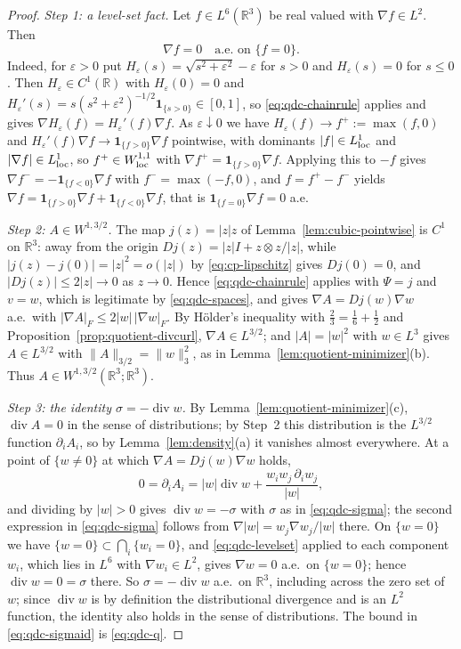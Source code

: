 \documentclass[11pt]{article}
\theoremstyle{definition}
\theoremstyle{plain}
\newcommand{\R}{\mathbb R}
\newcommand{\norm}[1]{\lVert #1\rVert}
\begin{document}
\begin{proof}
\emph{Step 1: a level-set fact.}  Let $f\in L^6(\R^3)$ be real valued with
$\nabla f\in L^2$.  Then
\begin{equation}\label{eq:qdc-levelset}
 \nabla f=0\quad\text{a.e.\ on }\{f=0\}.
\end{equation}
Indeed, for $\varepsilon>0$ put $H_\varepsilon(s)=\sqrt{s^2+\varepsilon^2}-\varepsilon$
for $s>0$ and $H_\varepsilon(s)=0$ for $s\le0$.  Then $H_\varepsilon\in C^1(\R)$
with $H_\varepsilon(0)=0$ and
$H_\varepsilon'(s)=s(s^2+\varepsilon^2)^{-1/2}\mathbf1_{\{s>0\}}\in[0,1]$, so
\eqref{eq:qdc-chainrule} applies and gives
$\nabla H_\varepsilon(f)=H_\varepsilon'(f)\nabla f$.  As
$\varepsilon\downarrow0$ we have $H_\varepsilon(f)\to f^+:=\max(f,0)$ and
$H_\varepsilon'(f)\nabla f\to\mathbf1_{\{f>0\}}\nabla f$ pointwise, with
dominants $|f|\in L^1_{\rm loc}$ and $|\nabla f|\in L^1_{\rm loc}$, so
$f^+\in W^{1,1}_{\rm loc}$ with $\nabla f^+=\mathbf1_{\{f>0\}}\nabla f$.
Applying this to $-f$ gives
$\nabla f^-=-\mathbf1_{\{f<0\}}\nabla f$ with $f^-=\max(-f,0)$, and
$f=f^+-f^-$ yields
$\nabla f=\mathbf1_{\{f>0\}}\nabla f+\mathbf1_{\{f<0\}}\nabla f$, that is
$\mathbf1_{\{f=0\}}\nabla f=0$ a.e.

\emph{Step 2: $A\in W^{1,3/2}$.}  The map $j(z)=|z|z$ of
Lemma~\ref{lem:cubic-pointwise} is $C^1$ on $\R^3$: away from the origin
$Dj(z)=|z|I+z\otimes z/|z|$, while
$|j(z)-j(0)|=|z|^2=o(|z|)$ by \eqref{eq:cp-lipschitz} gives $Dj(0)=0$, and
$|Dj(z)|\le2|z|\to0$ as $z\to0$.  Hence \eqref{eq:qdc-chainrule} applies with $\Psi=j$ and $v=w$,
which is legitimate by \eqref{eq:qdc-spaces}, and gives
$\nabla A=Dj(w)\nabla w$ a.e.\ with $|\nabla A|_F\le2|w|\,|\nabla w|_F$.  By
H\"older's inequality with $\frac23=\frac16+\frac12$ and
Proposition~\ref{prop:quotient-divcurl}, $\nabla A\in L^{3/2}$; and
$|A|=|w|^2$ with $w\in L^3$ gives $A\in L^{3/2}$ with
$\norm A_{3/2}=\norm w_3^2$, as in Lemma~\ref{lem:quotient-minimizer}(b).
Thus $A\in W^{1,3/2}(\R^3;\R^3)$.

\emph{Step 3: the identity $\sigma=-\operatorname{div}w$.}  By
Lemma~\ref{lem:quotient-minimizer}(c), $\operatorname{div}A=0$ in the sense
of distributions; by Step~2 this distribution is the $L^{3/2}$ function
$\partial_iA_i$, so by Lemma~\ref{lem:density}(a) it vanishes almost
everywhere.  At a point of $\{w\ne0\}$ at which $\nabla A=Dj(w)\nabla w$
holds,
\[
 0=\partial_iA_i=|w|\operatorname{div}w+\frac{w_iw_j\,\partial_iw_j}{|w|},
\]
and dividing by $|w|>0$ gives $\operatorname{div}w=-\sigma$ with $\sigma$ as
in \eqref{eq:qdc-sigma}; the second expression in \eqref{eq:qdc-sigma}
follows from $\nabla|w|=w_j\nabla w_j/|w|$ there.  On $\{w=0\}$ we have
$\{w=0\}\subset\bigcap_i\{w_i=0\}$, and \eqref{eq:qdc-levelset} applied to
each component $w_i$, which lies in $L^6$ with $\nabla w_i\in L^2$, gives
$\nabla w=0$ a.e.\ on $\{w=0\}$; hence $\operatorname{div}w=0=\sigma$ there.
So $\sigma=-\operatorname{div}w$ a.e.\ on $\R^3$, including across the zero
set of $w$; since $\operatorname{div}w$ is by definition the distributional
divergence and is an $L^2$ function, the identity also holds in the sense of
distributions.  The bound in \eqref{eq:qdc-sigmaid} is \eqref{eq:qdc-q}.


\end{proof}
\end{document}
